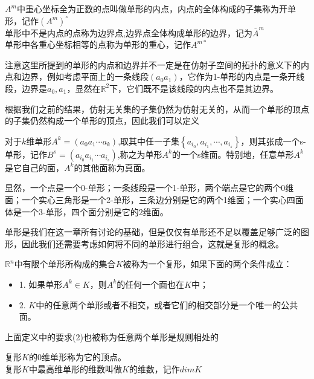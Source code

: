 \begin{definition}
$A^{m}$中重心坐标全为正数的点叫做单形的内点，内点的全体构成的子集称为开单形，记作$({A}^{m})^{\circ}$\\
单形中不是内点的点称为边界点,边界点全体构成单形的边界，记为$\overline{A}^{m}$\\
单形中各重心坐标相等的点称为单形的重心，记作$A^{m*}$
\end{definition}
\begin{remark}
注意这里所提到的单形的内点和边界并不一定是在仿射子空间的拓扑的意义下的内点和边界，例如考虑平面上的一条线段$(a_{0}a_{1})$，它作为1-单形的内点是一条开线段，边界是$a_{0},a_{1}$，显然在$\mathbb{R}^{2}$下，它们既不是该线段的内点也不是其边界。
\end{remark}
根据我们之前的结果，仿射无关集的子集仍然为仿射无关的，从而一个单形的顶点的子集仍然构成一个单形的顶点，因此我们可以定义
\begin{definition}
对于$k$维单形$A^{k}=(a_{0}a_{1}\cdots a_{k})$,取其中任一子集$\left\{a_{i_{0}},a_{i_{1}},\cdots,a_{i_{s}}\right\}$，则其张成一个s-单形，记作$B^{s}=(a_{i_{0}}a_{i_{1}}\cdots a_{i_{s}})$,称之为单形$A^{k}$的一个s维面。特别地，任意单形$A^{k}$是它自己的面，$A^{k}$的其他面称为真面。
\end{definition}
\begin{example}
显然，一个点是一个0-单形；一条线段是一个1-单形，两个端点是它的两个0维面；一个实心三角形是一个2-单形，三条边分别是它的两个1维面；一个实心四面体是一个3-单形，四个面分别是它的2维面。
\end{example}
单形是我们在这一章所有讨论的基础，但是仅仅有单形还不足以覆盖足够广泛的图形，因此我们还需要考虑如何将不同的单形进行组合，这就是复形的概念。
\begin{definition}
$\mathbb{R}^{n}$中有限个单形所构成的集合$K$被称为一个复形，如果下面的两个条件成立：
\begin{itemize}
    \item 1. 如果单形$A^{k}\in K$，则$A^{k}$的任何一个面也在$K$中；
    \item 2. $K$中的任意两个单形或者不相交，或者它们的相交部分是一个唯一的公共面。
\end{itemize}
\end{definition}
\begin{remark}
    上面定义中的要求(2)也被称为任意两个单形是规则相处的
\end{remark}
\begin{definition}
复形$K$的0维单形称为它的顶点。\\
复形$K$中最高维单形的维数叫做$K$的维数，记作$dimK$
\end{definition}

